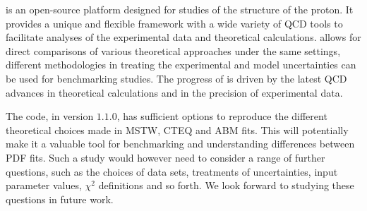 
\label{sec:summary}
\fitter is an open-source platform designed for studies of the structure of the proton.
It provides a unique and flexible framework with a wide variety of QCD tools to 
facilitate analyses of the experimental data and theoretical calculations. 
\fitter allows for direct comparisons of various theoretical approaches under the same settings,
different methodologies in treating the experimental and model uncertainties can be used for benchmarking studies.
The progress of \fitter is driven by the latest QCD advances in theoretical calculations and in the precision of experimental data.

The \fitter code, in version $1.1.0$, has sufficient options to reproduce the different theoretical choices made in MSTW, CTEQ and ABM fits. This will potentially make it a  
valuable tool for benchmarking and understanding differences between PDF fits. Such a study would however need to consider a range of further questions, such as the choices of
data sets, treatments of uncertainties, input parameter values, $\chi^2$ definitions and so forth. We look forward to studying these questions in future work.


